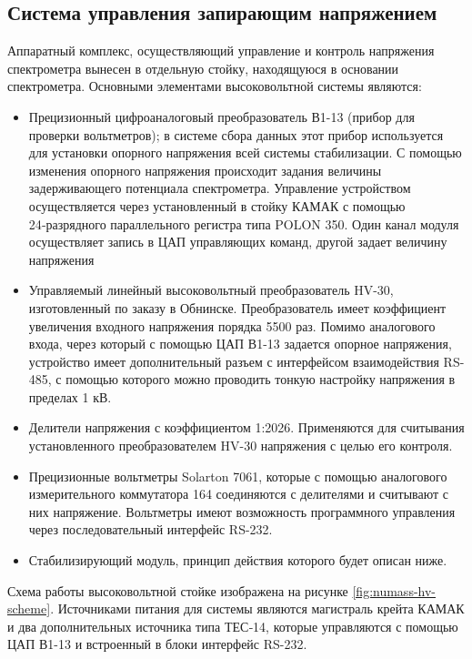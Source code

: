 \documentclass[a4paper,14pt]{extreport}
\begin{document}
\subsection{Система управления запирающим напряжением}

Аппаратный комплекс, осуществляющий управление и контроль напряжения спектрометра вынесен в отдельную стойку, находящуюся в основании спектрометра. Основными элементами высоковольтной системы являются:
\begin{itemize}
    \item Прецизионный цифроаналоговый преобразователь В1-13 (прибор для проверки вольтметров); в системе сбора данных этот прибор используется для установки опорного напряжения всей системы стабилизации. С помощью изменения опорного напряжения происходит задания величины задерживающего потенциала спектрометра. Управление устройством осуществляется через установленный в стойку КАМАК с помощью 24‑разрядного параллельного регистра типа POLON 350. Один канал модуля осуществляет запись в ЦАП управляющих команд, другой задает величину напряжения
    \item Управляемый линейный высоковольтный преобразователь HV-30, изготовленный по заказу в Обнинске. Преобразователь имеет коэффициент увеличения входного напряжения порядка 5500 раз. Помимо аналогового входа, через который с помощью ЦАП В1-13 задается опорное напряжения, устройство имеет дополнительный разъем с интерфейсом взаимодействия RS-485, с помощью которого можно проводить тонкую настройку напряжения в пределах 1 кВ.
    \item Делители напряжения с коэффициентом 1:2026. Применяются для считывания установленного преобразователем HV-30 напряжения с целью его контроля.
    \item Прецизионные вольтметры Solarton 7061, которые с помощью аналогового измерительного коммутатора 164 соединяются с делителями и считывают с них напряжение. Вольтметры имеют возможность программного управления через последовательный интерфейс RS-232.
    \item Стабилизирующий модуль, принцип действия которого будет описан ниже.
\end{itemize}

Схема работы высоковольтной стойке изображена на рисунке \ref{fig:numass-hv-scheme}. Источниками питания для системы являются магистраль крейта КАМАК и два дополнительных источника типа ТЕС‑14, которые управляются с помощью ЦАП В1-13 и встроенный в блоки интерфейс RS-232.
\end{document}
